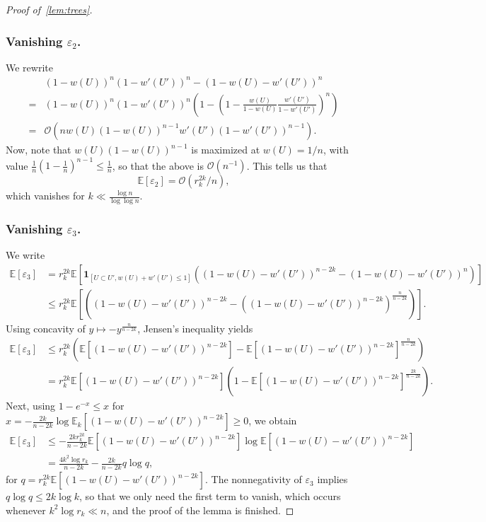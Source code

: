 \documentclass[11pt]{article}
\theoremstyle{definition}
\theoremstyle{remark}
\theoremstyle{remark}
\numberwithin{theorem}{section}
\newcommand{\E}{\mathbb{E}}
\newcommand{\I}[1]{{\mathbf 1}_{[#1]}}
\newcommand{\bigO}{\mathcal{O}}
\begin{document}
\begin{proof}[Proof of~\cref{lem:trees}]
    \subsubsection*{Vanishing $\varepsilon_2$.}
    We rewrite
    \begin{align*}
        &(1-w(U))^n(1-w'(U'))^n-(1-w(U)-w'(U'))^n\\
        =&(1-w(U))^n(1-w'(U'))^n\left(1-\left(1-\frac{w(U)}{1-w(U)}\frac{w'(U')}{1-w'(U')}\right)^n\right)\\
        =&\bigO\left(nw(U)(1-w(U))^{n-1}w'(U')(1-w'(U'))^{n-1}\right).
    \end{align*}
    Now, note that $w(U)(1-w(U))^{n-1}$ is maximized at $w(U)=1/n$, with value $\tfrac1n(1-\tfrac1n)^{n-1}\le \tfrac1n$, so that the above is $\bigO(n^{-1})$.
    This tells us that
    \[
    \E[\varepsilon_2]=\bigO(r_k^{2k}/n),
    \]
    which vanishes for $k\ll\frac{\log n}{\log\log n}$.
    \subsubsection*{Vanishing $\varepsilon_3$.} 
    We write
    \begin{align*}
    \E[\varepsilon_3]
    &=r_k^{2k}\E\left[\I{U\subset U',w(U)+w'(U')\le1}\left(\left(1-w(U)-w'(U')\right)^{n-2k}-\left(1-w(U)-w'(U')\right)^{n}\right)\right]\\
    &\le r_k^{2k}\E\left[\left(\left(1-w(U)-w'(U')\right)^{n-2k}-\left(\left(1-w(U)-w'(U')\right)^{n-2k}\right)^{\frac n{n-2k}}\right)\right].
    \end{align*}
    Using concavity of $y\mapsto -y^{\frac n{n-2k}}$, Jensen's inequality yields
    \begin{align*}
    \E[\varepsilon_3]&\le r_k^{2k}\left(\E\left[(1-w(U)-w'(U'))^{n-2k}\right]-\E\left[(1-w(U)-w'(U'))^{n-2k}\right]^{\frac n{n-2k}}\right)\\
    &=r_k^{2k}\E\left[(1-w(U)-w'(U'))^{n-2k}\right]\left(1-\E\left[(1-w(U)-w'(U'))^{n-2k}\right]^{\frac{2k}{n-2k}}\right).
    \end{align*}
    Next, using $1-e^{-x}\le x$ for $x=-\frac{2k}{n-2k}\log\E_k\left[(1-w(U)-w'(U'))^{n-2k}\right]\ge0$, we obtain
    \begin{align*}
        \E[\varepsilon_3]
        &\le -\frac{2kr_k^{2k}}{n-2k}\E\left[(1-w(U)-w'(U'))^{n-2k}\right]\log\E\left[(1-w(U)-w'(U'))^{n-2k}\right]\\
        &=\frac{4k^2\log r_k}{n-2k}-\frac{2k}{n-2k}q\log q,
    \end{align*}
    for $q=r_k^{2k}\E\left[(1-w(U)-w'(U'))^{n-2k}\right]$.
    The nonnegativity of $\varepsilon_3$ implies $q\log q\le 2k\log k$, so that we only need the first term to vanish, which occurs whenever $k^2\log r_k\ll n$,
    and the proof of the lemma is finished.
\end{proof}
\end{document}

